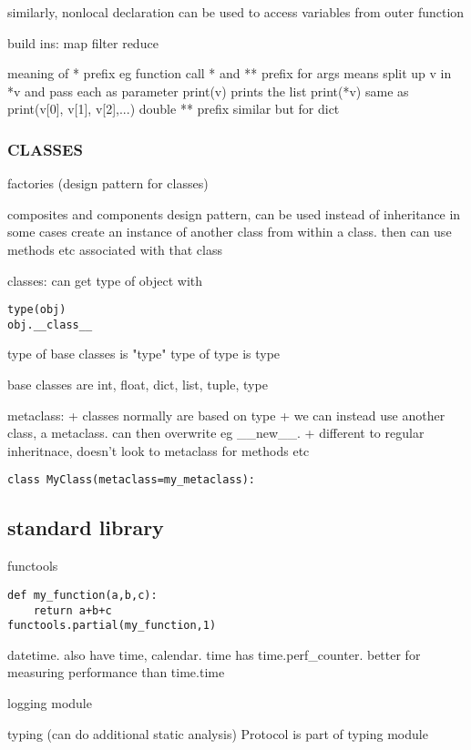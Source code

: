 similarly, nonlocal declaration can be used to access variables from outer function

build ins:
map
filter
reduce




meaning of * prefix
eg function call * and ** prefix for args
means split up v in *v and pass each as parameter
print(v) prints the list
print(*v) same as print(v[0], v[1], v[2],...)
double ** prefix similar but for dict

\subsubsection{CLASSES}

factories (design pattern for classes)

composites and components
design pattern, can be used instead of inheritance in some cases
create an instance of another class from within a class. then can use methods etc associated with that class

classes: can get type of object with
\begin{verbatim}
type(obj)
obj.__class__
\end{verbatim}
type of base classes is "type"
type of type is type

base classes are int, float, dict, list, tuple, type

metaclass:
+ classes normally are based on type
+ we can instead use another class, a metaclass. can then overwrite eg \_\_new\_\_.
+ different to regular inheritnace, doesn't look to metaclass for methods etc

\begin{verbatim}
class MyClass(metaclass=my_metaclass):
\end{verbatim}

\subsection{standard library}

functools
\begin{verbatim}
def my_function(a,b,c):
    return a+b+c
functools.partial(my_function,1)
\end{verbatim}


datetime. also have time, calendar. time has time.perf\_counter. better for measuring performance than time.time

logging module

typing (can do additional static analysis)
Protocol is part of typing module

